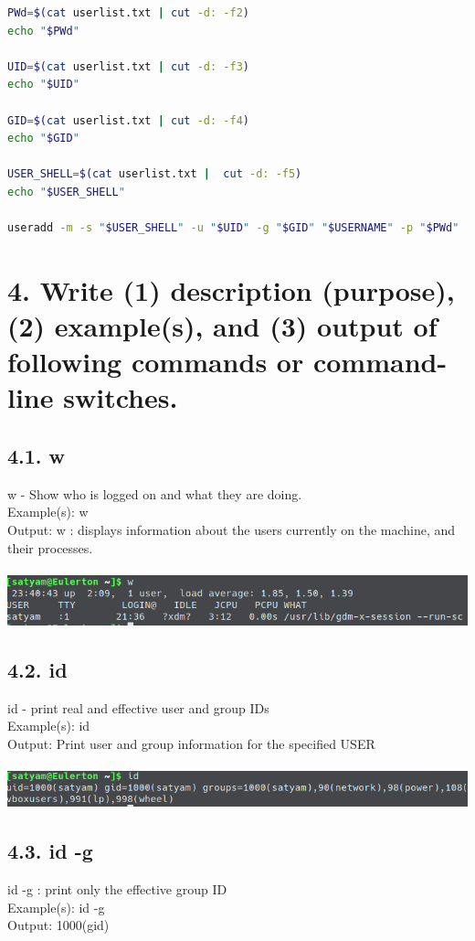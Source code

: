 \documentclass[11pt,a4]{article}
\begin{document}
\begin{enumerate}
\begin{lstlisting}[language=bash]
PWd=$(cat userlist.txt | cut -d: -f2)
echo "$PWd"

UID=$(cat userlist.txt | cut -d: -f3)
echo "$UID"

GID=$(cat userlist.txt | cut -d: -f4)
echo "$GID"

USER_SHELL=$(cat userlist.txt |  cut -d: -f5)
echo "$USER_SHELL"

useradd -m -s "$USER_SHELL" -u "$UID" -g "$GID" "$USERNAME" -p "$PWd"
\end{lstlisting}
\section*{4. Write (1) description (purpose), (2) example(s), and (3) output of following commands
	or command-line switches.}
\subsection*{4.1. w}
w - Show who is logged on and what they are doing.\\
Example(s): w\\
Output: w : displays  information  about the users currently on the machine, and
their processes.\\\\
\includegraphics[width=\textwidth]{Q4_1.png}
\subsection*{4.2. id}
id - print real and effective user and group IDs\\
Example(s): id\\
Output: Print user and group information for the specified USER \\\\
\includegraphics[width=\textwidth]{Q4_2.png}
\subsection*{4.3. id -g}
id -g : print only the effective group ID\\
Example(s): id -g \\
Output: 1000(gid)

\end{enumerate}
\end{document}
